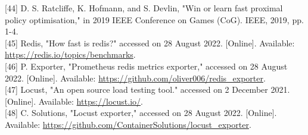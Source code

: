 \documentclass[10pt]{article}
\begin{document}
[44] D. S. Ratcliffe, K. Hofmann, and S. Devlin, "Win or learn fast proximal policy optimisation," in 2019 IEEE Conference on Games (CoG). IEEE, 2019, pp. 1-4.\\[0pt]
[45] Redis, "How fast is redis?" accessed on 28 August 2022. [Online]. Available: \href{https://redis.io/topics/benchmarks}{https://redis.io/topics/benchmarks}.\\[0pt]
[46] P. Exporter, "Prometheus redis metrics exporter," accessed on 28 August 2022. [Online]. Available: \href{https://github.com/oliver006/redis_exporter}{https://github.com/oliver006/redis\_exporter}.\\[0pt]
[47] Locust, "An open source load testing tool." accessed on 2 December 2021. [Online]. Available: \href{https://locust.io/}{https://locust.io/}.\\[0pt]
[48] C. Solutions, "Locust exporter," accessed on 28 August 2022. [Online]. Available: \href{https://github.com/ContainerSolutions/locust_exporter}{https://github.com/ContainerSolutions/locust\_exporter}.
\end{document}
